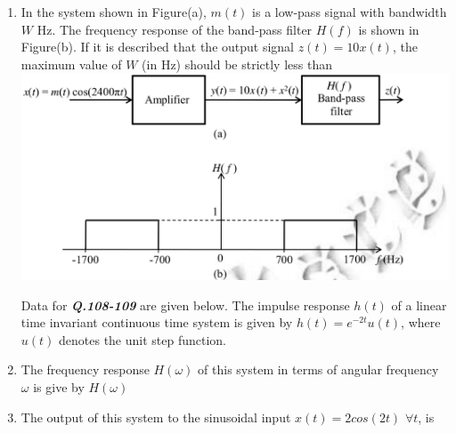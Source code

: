 \documentclass[journal,12pt,twocolumn]{IEEEtran}
\begin{document}
\begin{enumerate}
\item In the system shown in Figure(a), $m(t)$ is a low-pass signal with bandwidth $W$ Hz. The frequency response of the band-pass filter $H(f)$ is shown in Figure(b). If it is described that the output signal $z(t)=10x(t)$, the maximum value of $W$ (in Hz) should be strictly less than \underline{\hspace{2cm}}\\
\includegraphics[scale=0.2]{fig17.eps}


Data for \textbf{\textit{Q.108-109}} are given below.\newline
\hspace{1em}The impulse response $h(t)$ of a linear time invariant continuous time system is given by $h(t)=e^{-2t}u(t)$, where $u(t)$ denotes the unit step function.\newline
\item The frequency response $H(\omega)$ of this system in terms of angular frequency $\omega$ is give by $H(\omega)$ 



\begin{enumerate}[(A)]
\end{enumerate}



\item The output of this system to the sinusoidal input $x(t)=2cos(2t)$ $\forall t$, is


\end{enumerate}
\end{document}
